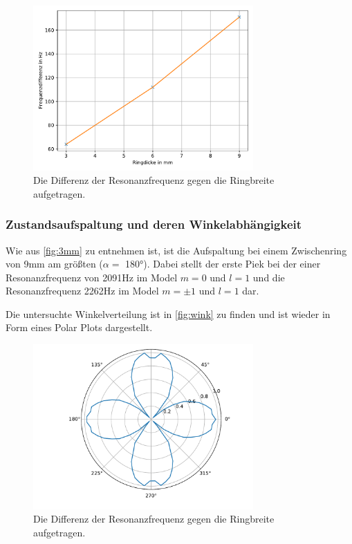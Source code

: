 \begin{figure}
  \centering
  \includegraphics[width=0.75\textwidth]{pic/aufspaltung.pdf}
  \caption{Die Differenz der Resonanzfrequenz gegen die Ringbreite aufgetragen.}
  \label{fig:aufspaltung}
\end{figure}



\subsubsection{Zustandsaufspaltung und deren Winkelabhängigkeit}
Wie aus \autoref{fig:3mm} zu entnehmen ist, ist die Aufspaltung bei einem Zwischenring von 9mm am größten ($\alpha = $ 180°). Dabei stellt der erste Piek bei der einer
Resonanzfrequenz von 2091Hz im Model $m=0$ und $l=1$ und die Resonanzfrequenz 2262Hz im Model $m= \pm 1$ und $l=1$ dar.

\noindent
Die untersuchte Winkelverteilung ist in \autoref{fig:wink} zu finden und ist wieder in Form eines Polar Plots dargestellt.


\begin{figure}
    \centering
    \includegraphics[width=0.75\textwidth]{pic/polar_9mm.pdf}
    \caption{Die Differenz der Resonanzfrequenz gegen die Ringbreite aufgetragen.}
    \label{fig:wink}
  \end{figure}
  
